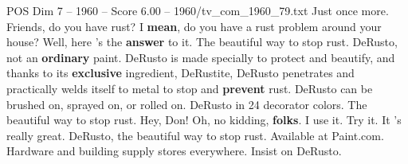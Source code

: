 \begin{textsample}{POS Dim 7 – 1960 – Score 6.00 – 1960/tv\_com\_1960\_79.txt}  \label{ex:f7_pos_021}
Just once more.
Friends, do you have rust?
I \textbf{mean}, do you have a rust problem around your house?
Well, here 's the \textbf{answer} to it.
The beautiful way to stop rust.
DeRusto, not an \textbf{ordinary} paint.
DeRusto is made specially to protect and beautify, and thanks to its \textbf{exclusive} ingredient, DeRustite, DeRusto penetrates and practically welds itself to metal to stop and \textbf{prevent} rust.
DeRusto can be brushed on, sprayed on, or rolled on.
DeRusto in 24 decorator colors.
The beautiful way to stop rust.
Hey, Don!
Oh, no kidding, \textbf{folks}.
I use it.
Try it.
It 's really great.
DeRusto, the beautiful way to stop rust.
Available at Paint.com.
Hardware and building supply stores everywhere.
Insist on DeRusto.

\end{textsample}
